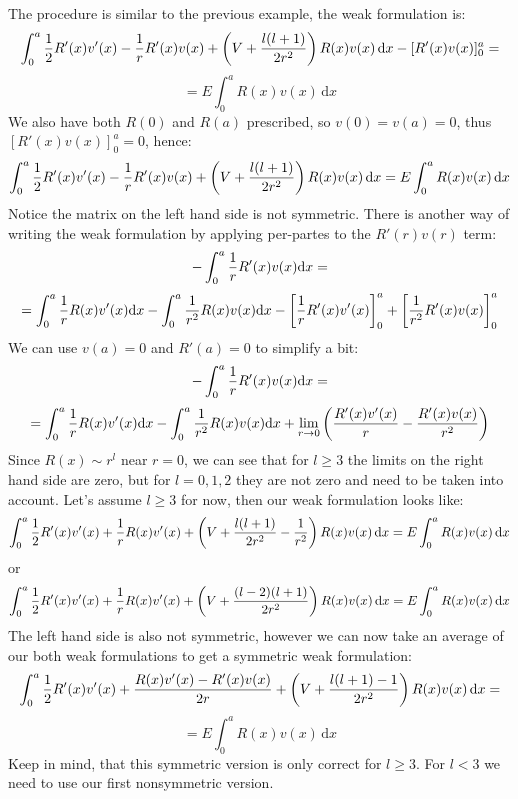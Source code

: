 \documentclass[12pt]{article}
\def\d{\mbox{d}}
\begin{document}
The procedure is similar to the previous example, the weak formulation is:
$$\int_0^a {1\over2}R'(x)v'(x)-{1\over r}R'(x)v(x)+
\left(V+{l(l+1)\over2r^2}\right)R(x)v(x)\,\d x
-[R'(x)v(x)]_0^a
=
$$
$$
=E\int_0^aR(x)v(x)\,\d x
$$
We also have both $R(0)$ and $R(a)$ prescribed, so $v(0)=v(a)=0$, thus
$[R'(x)v(x)]_0^a=0$, hence:
$$\int_0^a {1\over2}R'(x)v'(x)-{1\over r}R'(x)v(x)+
\left(V+{l(l+1)\over2r^2}\right)R(x)v(x)\,\d x
=
E\int_0^aR(x)v(x)\,\d x
$$
Notice the matrix on the left hand side is not symmetric. There is another way
of writing the weak formulation by applying per-partes to the $R'(r)v(r)$ term:
$$-\int_0^a{1\over r}R'(x)v(x)\d x=
$$
$$
=\int_0^a{1\over r}R(x)v'(x)\d x
-\int_0^a{1\over r^2}R(x)v(x)\d x
-\left[{1\over r}R'(x)v'(x)\right]_0^a
+\left[{1\over r^2}R'(x)v(x)\right]_0^a
$$
We can use $v(a)=0$ and $R'(a)=0$ to simplify a bit:
$$-\int_0^a{1\over r}R'(x)v(x)\d x=
$$
$$
=\int_0^a{1\over r}R(x)v'(x)\d x
-\int_0^a{1\over r^2}R(x)v(x)\d x
+\lim_{r\to0}\left({R'(x)v'(x)\over r}-{R'(x)v(x)\over r^2}\right)
$$
Since $R(x)\sim r^l$ near $r=0$, we can see that for $l\ge3$ the limits
on the right hand side are zero, but for $l=0, 1, 2$ they are not zero and need
to be taken into account. Let's assume $l\ge3$ for now, then our weak formulation looks like:
$$\int_0^a {1\over2}R'(x)v'(x)+{1\over r}R(x)v'(x)+
\left(V+{l(l+1)\over2r^2}-{1\over r^2}\right)R(x)v(x)\,\d x
=
E\int_0^aR(x)v(x)\,\d x
$$
or
$$\int_0^a {1\over2}R'(x)v'(x)+{1\over r}R(x)v'(x)+
\left(V+{(l-2)(l+1)\over2r^2}\right)R(x)v(x)\,\d x
=
E\int_0^aR(x)v(x)\,\d x
$$
The left hand side is also not symmetric, however we can now take an average of
our both weak formulations to get a symmetric weak formulation:
$$\int_0^a {1\over2}R'(x)v'(x)+{R(x)v'(x)-R'(x)v(x)\over 2r}+
\left(V+{l(l+1)-1\over2r^2}\right)R(x)v(x)\,\d x
=
$$
$$
=
E\int_0^aR(x)v(x)\,\d x
$$
Keep in mind, that this symmetric version is only correct for $l\ge3$. For
$l<3$ we need to use our first nonsymmetric version.
\end{document}
